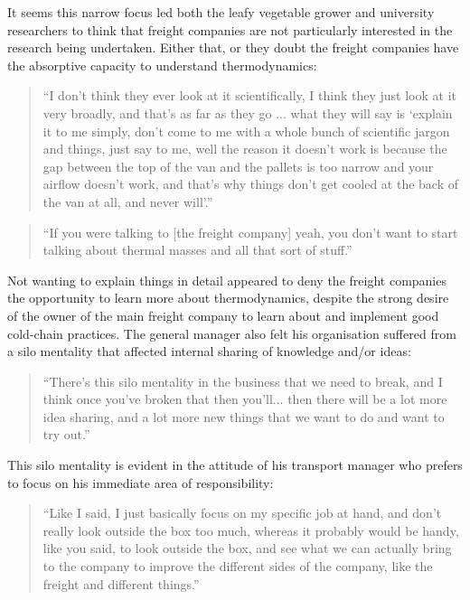 It seems this narrow focus led both the leafy vegetable grower and university researchers to think that freight companies are not particularly interested in the research being undertaken. Either that, or they doubt the freight companies have the absorptive capacity to understand thermodynamics:

\begin{quote}
\small
\enquote{I don't think they ever look at it scientifically, I think they just look at it very broadly, and that's as far as they go ... what they will say is \enquote{explain it to me simply, don't come to me with a whole bunch of scientific jargon and things, just say to me, well the reason it doesn't work is because the gap between the top of the van and the pallets is too narrow and your airflow doesn't work, and that's why things don't get cooled at the back of the van at all, and never will}.} \\
\end{quote}

\begin{quote}
\small
\enquote{If you were talking to [the freight company] yeah, you don't want to start talking about thermal masses and all that sort of stuff.} \\
\end{quote}

Not wanting to explain things in detail appeared to deny the freight companies the opportunity to learn more about thermodynamics, despite the strong desire of the owner of the main freight company to learn about and implement good cold-chain practices. The general manager also felt his organisation suffered from a silo mentality that affected internal sharing of knowledge and/or ideas: 

\begin{quote}
\small
\enquote{There’s this silo mentality in the business that we need to break, and I think once you've broken that then you'll... then there will be a lot more idea sharing, and a lot more new things that we want to do and want to try out.} \\
\end{quote}

This silo mentality is evident in the attitude of his transport manager who prefers to focus on his immediate area of responsibility: 

\begin{quote}
\small
\enquote{Like I said, I just basically focus on my specific job at hand, and don't really look outside the box too much, whereas it probably would be handy, like you said, to look outside the box, and see what we can actually bring to the company to improve the different sides of the company, like the freight and different things.} \\
\end{quote}

